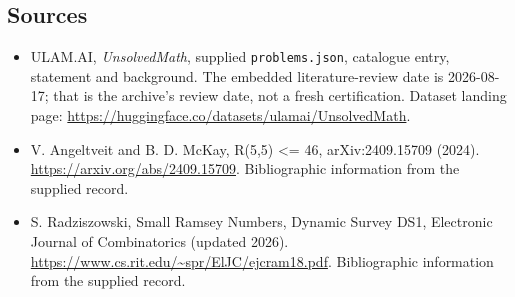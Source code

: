 \documentclass[11pt,a4paper]{article}
\begin{document}
\subsection{Sources}

{\small

\begin{itemize}

\item[\hypertarget{source:statement:1}{S1}] ULAM.AI, \emph{UnsolvedMath}, supplied \texttt{problems.json}, catalogue entry, statement and background. The embedded literature-review date is 2026-08-17; that is the archive’s review date, not a fresh certification. Dataset landing page: \url{https://huggingface.co/datasets/ulamai/UnsolvedMath}.

\item[\hypertarget{source:statement:2}{S2}] V. Angeltveit and B. D. McKay, R(5,5) <= 46, arXiv:2409.15709 (2024). \url{https://arxiv.org/abs/2409.15709}. Bibliographic information from the supplied record.

\item[\hypertarget{source:statement:3}{S3}] S. Radziszowski, Small Ramsey Numbers, Dynamic Survey DS1, Electronic Journal of Combinatorics (updated 2026). \url{https://www.cs.rit.edu/~spr/ElJC/ejcram18.pdf}. Bibliographic information from the supplied record.

\end{itemize}

}

\label{end:statement}
\end{document}
